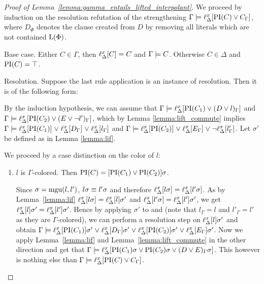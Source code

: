 \begin{proof}[Proof of Lemma~\ref{lemma:gamma_entails_lifted_interpolant}]
	We proceed by induction on the resolution refutation of the strengthening $\Gamma \entails \lifdelta{\PI(C) \lor\nolinebreak C_\Gamma}$,
	where $D_\Phi$ denotes the clause created from $D$ by removing all literals which are not contained $\operatorname{L}(\Phi)$.

	\begin{description}
		\item{Base case.}
			Either $C \in \Gamma$, then $\ell_{\Delta}^{x}[C] = C$ and $\Gamma \models C$.
			Otherwise $C \in \Delta$ and $\operatorname{PI}(C) = \top$.

		\item{Resolution.}
			Suppose the last rule application is an instance of resolution. Then it is of the following form:
			\begin{prooftree}
			\end{prooftree}

			By the induction hypothesis, we can assume that
			$\Gamma \models \ell_{\Delta}^{x}[\operatorname{PI}(C_1) \lor (D\lor l)_\Gamma]$ and $\Gamma \models \ell_{\Delta}^{x}[\operatorname{PI}(C_2) \lor (E\lor \lnot l')_\Gamma]$,
			which by Lemma \ref{lemma:lift_commute} implies 
			\markA{} $\Gamma \models \ell_{\Delta}^{x}[\operatorname{PI}(C_1)] \;{\lor}\;\allowbreak \ell_{\Delta}^{x}[D_\Gamma] \;{\lor}\;\allowbreak \ell_{\Delta}^{x}[l_\Gamma]$ and \markB{} $\Gamma \models \ell_{\Delta}^{x}[\operatorname{PI}(C_2)] \;{\lor}\; \ell_{\Delta}^{x}[E_\Gamma] \;{\lor}\; \lnot \ell_{\Delta}^{x}[l'_\Gamma]$.
			Let $\sigma'$ be defined as in Lemma \ref{lemma:lif}.

			We proceed by a case distinction on the color of $l$:
			\begin{enumerate}
				\item $l$ is $\Gamma$-colored. Then $\operatorname{PI}(C) = [\operatorname{PI}(C_1) \lor \operatorname{PI}(C_2)]\sigma$.
					
					Since $\sigma = \operatorname{mgu}(l, l')$, $l\sigma \equiv l'\sigma$ and therefore $\ell_{\Delta}^{x}[l\sigma] = \ell_{\Delta}^{x}[l'\sigma]$.
					As by Lemma~\ref{lemma:lif} $\ell_{\Delta}^{x}[l\sigma] = \ell_{\Delta}^{x}[l]\sigma'$ and $\ell_{\Delta}^{x}[l'\sigma] = \ell_{\Delta}^{x}[l']\sigma'$,
					we get $\ell_{\Delta}^{x}[l]\sigma' = \ell_{\Delta}^{x}[l']\sigma'$.\label{aou5jklah}
					Hence by applying $\sigma'$ to \markA{} and \markB{} (note that $l_\Gamma = l$ and $l'_\Gamma = l'$ as they are $\Gamma$-colored), we can perform a resolution step on $\ell_{\Delta}^{x}[l]\sigma'$ and obtain
					$\Gamma \models \ell_{\Delta}^{x}[\operatorname{PI}(C_1)]\sigma' \;{\lor}\; \ell_{\Delta}^{x}[D_\Gamma] \sigma' \;{\lor}\; \ell_{\Delta}^{x}[\operatorname{PI}(C_2)]\sigma' \;{\lor}\; \ell_{\Delta}^{x}[E_\Gamma] \sigma'$.
					Now we apply Lemma~\ref{lemma:lif} and Lemma~\ref{lemma:lift_commute} in the other direction 
					and get that 
					$\Gamma \models \ell_{\Delta}^{x}[\operatorname{PI}(C_1)\sigma \lor \operatorname{PI}(C_2)\sigma \lor\allowbreak (D \lor E)_\Gamma \sigma]$.
					This however is nothing else than 
					$\Gamma \models \ell_{\Delta}^{x}[\operatorname{PI}(C) \lor C_\Gamma]$.


\end{enumerate}
\end{description}
\end{proof}
